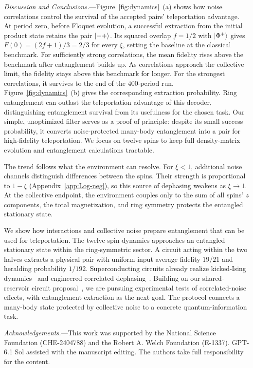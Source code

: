 \documentclass[aps,prl,reprint,amsmath,amssymb,floatfix,superscriptaddress]{revtex4-2}
\begin{document}
{\it Discussion and Conclusions.}---Figure~\ref{fig:dynamics}~(a) shows how noise correlations control the survival of the accepted pairs' teleportation advantage. At period zero, before Floquet evolution, a successful extraction from the initial product state retains the pair $\ket{++}$. Its squared overlap $f=1/2$ with $\ket{\Phi^+}$ gives $F(0)=(2f+1)/3=2/3$ for every $\xi$, setting the baseline at the classical benchmark. For sufficiently strong correlations, the mean fidelity rises above the benchmark after entanglement builds up. As correlations approach the collective limit, the fidelity stays above this benchmark for longer. For the strongest correlations, it survives to the end of the $400$-period run. Figure~\ref{fig:dynamics}~(b) gives the corresponding extraction probability. Ring entanglement can outlast the teleportation advantage of this decoder, distinguishing entanglement survival from its usefulness for the chosen task. Our simple, unoptimized filter serves as a proof of principle: despite its small success probability, it converts noise-protected many-body entanglement into a pair for high-fidelity teleportation. We focus on twelve spins to keep full density-matrix evolution and entanglement calculations tractable.

The trend follows what the environment can resolve. For $\xi<1$, additional noise channels distinguish differences between the spins. Their strength is proportional to $1-\xi$ (Appendix~\ref{app:Log-neg}), so this source of dephasing weakens as $\xi\rightarrow1$. At the collective endpoint, the environment couples only to the sum of all spins' $z$ components, the total magnetization, and ring symmetry protects the entangled stationary state.

We show how interactions and collective noise prepare entanglement that can be used for teleportation. The twelve-spin dynamics approaches an entangled stationary state within the ring-symmetric sector. A circuit acting within the two halves extracts a physical pair with uniform-input average fidelity $19/21$ and heralding probability $1/192$. Superconducting circuits already realize kicked-Ising dynamics~\cite{Mi2022edge} and engineered correlated dephasing~\cite{vonLupke2020}. Building on our shared-reservoir circuit proposal~\cite{Ayoub2026}, we are pursuing experimental tests of correlated-noise effects, with entanglement extraction as the next goal. The protocol connects a many-body state protected by collective noise to a concrete quantum-information task.

\begin{acknowledgments}
\emph{Acknowledgements.}---This work was supported by the National Science Foundation (CHE-2404788) and the Robert A. Welch Foundation (E-1337). GPT-6.1 Sol assisted with the manuscript editing. The authors take full responsibility for the content.
\end{acknowledgments}
\end{document}

